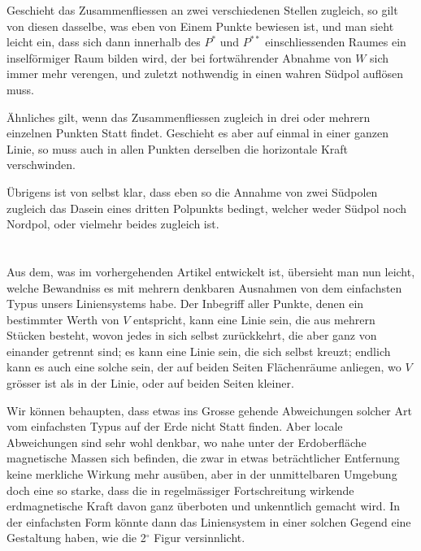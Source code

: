 \documentclass[fontsize=11pt,paper=a4,twoside,openany]{scrbook}
\begin{document}
Geschieht das Zusammenfliessen an zwei verschiedenen Stellen zugleich, so gilt von diesen dasselbe, was eben von Einem Punkte bewiesen ist, und man sieht leicht ein, dass sich dann innerhalb des $P^{*}$ und $P^{**}$ einschliessenden Raumes ein inselförmiger Raum bilden wird, der bei fortwährender Abnahme von $W$ sich immer mehr verengen, und zuletzt nothwendig in einen wahren Südpol auflösen muss.

Ähnliches gilt, wenn das Zusammenfliessen zugleich in drei oder mehrern einzelnen Punkten Statt findet. Geschieht es aber auf einmal in einer ganzen Linie, so muss auch in allen Punkten derselben die horizontale Kraft verschwinden.

Übrigens ist von selbst klar, dass eben so die Annahme von zwei Südpolen zugleich das Dasein eines dritten Polpunkts bedingt, welcher weder Südpol noch Nordpol, oder vielmehr beides zugleich ist.

\section{}

Aus dem, was im vorhergehenden Artikel entwickelt ist, übersieht man nun leicht, welche Bewandniss es mit mehrern denkbaren Ausnahmen von dem einfachsten Typus unsers Liniensystems habe. Der Inbegriff aller Punkte, denen ein bestimmter Werth von $V$ entspricht, kann eine Linie sein, die aus mehrern Stücken besteht, wovon jedes in sich selbst zurückkehrt, die aber ganz von einander getrennt sind; es kann eine Linie sein, die sich selbst kreuzt; endlich kann es auch eine solche sein, der auf beiden Seiten Flächenräume anliegen, wo $V$ grösser ist als in der Linie, oder auf beiden Seiten kleiner.

Wir können behaupten, dass etwas ins Grosse gehende Abweichungen solcher Art vom einfachsten Typus auf der Erde nicht Statt finden. Aber locale Abweichungen sind sehr wohl denkbar, wo nahe unter der Erdoberfläche magnetische Massen sich befinden, die zwar in etwas beträchtlicher Entfernung keine merkliche Wirkung mehr ausüben, aber in der unmittelbaren Umgebung doch eine so starke, dass die in regelmässiger Fortschreitung wirkende erdmagnetische Kraft davon ganz überboten und unkenntlich gemacht wird. In der einfachsten Form könnte dann das Liniensystem in einer solchen Gegend eine Gestaltung haben, wie die 2$^{\circ}$ Figur versinnlicht.

\section{}
\end{document}
